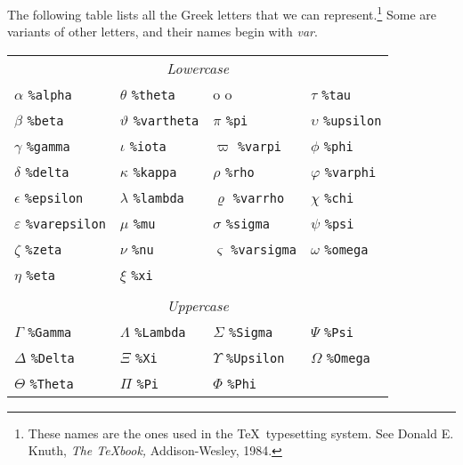 The following table lists all the Greek letters that we can
represent.\footnote{These names are the ones used in the \TeX\ typesetting
system.
See Donald E. Knuth, {\it The \TeX book,}  Addison-Wesley, 1984.}
Some are variants of other letters, and their names begin with {\it var}.
\begin{center}
  \begin{tabular}{llll}
    \multicolumn{4}{c}{\em Lowercase} \\
    $\alpha$ {\tt \%alpha} & $\theta$ {\tt \%theta} &
	o o & $\tau$ {\tt \%tau} \\
    $\beta$ {\tt \%beta} & $\vartheta$ {\tt \%vartheta} &
	$\pi$ {\tt \%pi} & $\upsilon$ {\tt \%upsilon} \\
    $\gamma$ {\tt \%gamma} & $\iota$ {\tt \%iota} &
	$\varpi$ {\tt \%varpi} & $\phi$ {\tt \%phi} \\
    $\delta$ {\tt \%delta} & $\kappa$ {\tt \%kappa} &
	$\rho$ {\tt \%rho} & $\varphi$ {\tt \%varphi} \\
    $\epsilon$ {\tt \%epsilon} & $\lambda$ {\tt \%lambda} &
	$\varrho$ {\tt \%varrho} & $\chi$ {\tt \%chi} \\
    $\varepsilon$ {\tt \%varepsilon} & $\mu$ {\tt \%mu} &
	$\sigma$ {\tt \%sigma} & $\psi$ {\tt \%psi} \\
    $\zeta$ {\tt \%zeta} & $\nu$ {\tt \%nu} &
	$\varsigma$ {\tt \%varsigma} & $\omega$ {\tt \%omega} \\
    $\eta$ {\tt \%eta} & $\xi$ {\tt \%xi} \\ \\
    \multicolumn{4}{c}{\em Uppercase} \\
    $\Gamma$ {\tt \%Gamma} & $\Lambda$ {\tt \%Lambda} &
	$\Sigma$ {\tt \%Sigma} & $\Psi$ {\tt \%Psi} \\
    $\Delta$ {\tt \%Delta} & $\Xi$ {\tt \%Xi} &
	$\Upsilon$ {\tt \%Upsilon} & $\Omega$ {\tt \%Omega} \\
    $\Theta$ {\tt \%Theta} & $\Pi$ {\tt \%Pi} & $\Phi$ {\tt \%Phi} \\
  \end{tabular}
\end{center}

